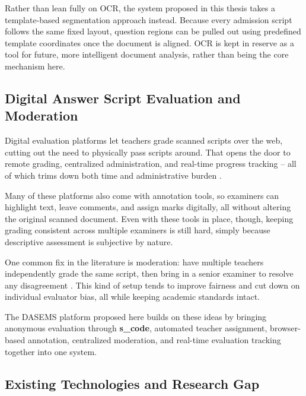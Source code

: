 Rather than lean fully on OCR, the system proposed in this thesis takes a template-based segmentation approach instead. Because every admission script follows the same fixed layout, question regions can be pulled out using predefined template coordinates once the document is aligned. OCR is kept in reserve as a tool for future, more intelligent document analysis, rather than being the core mechanism here.


\subsection{Digital Answer Script Evaluation and Moderation}

Digital evaluation platforms let teachers grade scanned scripts over the web, cutting out the need to physically pass scripts around. That opens the door to remote grading, centralized administration, and real-time progress tracking -- all of which trims down both time and administrative burden \cite{8878791,inproceedings}.

Many of these platforms also come with annotation tools, so examiners can highlight text, leave comments, and assign marks digitally, all without altering the original scanned document. Even with these tools in place, though, keeping grading consistent across multiple examiners is still hard, simply because descriptive assessment is subjective by nature.

One common fix in the literature is moderation: have multiple teachers independently grade the same script, then bring in a senior examiner to resolve any disagreement \cite{article}. This kind of setup tends to improve fairness and cut down on individual evaluator bias, all while keeping academic standards intact.

The DASEMS platform proposed here builds on these ideas by bringing anonymous evaluation through \textbf{s\_code}, automated teacher assignment, browser-based annotation, centralized moderation, and real-time evaluation tracking together into one system.


\subsection{Existing Technologies and Research Gap}


